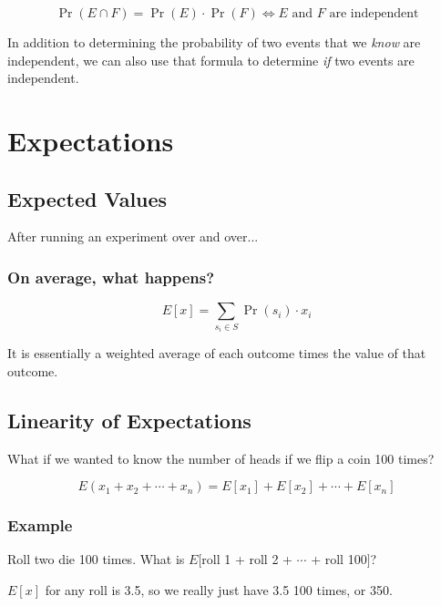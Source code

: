 \documentclass{report}
\DeclareMathOperator{\prob}{Pr}
\begin{document}
\begin{equation}
    \prob(E \cap F) = \prob(E) \cdot \prob(F) \iff \text{$E$ and $F$ are independent}
\end{equation}

In addition to determining the probability of two events that we \emph{know} are independent, we can also use that formula to determine \emph{if} two events are independent.

\section{Expectations}

\subsection{Expected Values}

After running an experiment over and over...

\subsubsection{On average, what happens?}

\begin{equation}
    E[x] = \sum_{s_i \in S}{\prob(s_i) \cdot x_i}
\end{equation}

It is essentially a weighted average of each outcome times the value of that outcome.

\subsection{Linearity of Expectations}

What if we wanted to know the number of heads if we flip a coin 100 times?

\begin{equation}
    E(x_1 + x_2 + \cdots + x_n) = E[x_1] + E[x_2] + \cdots + E[x_n]
\end{equation}

\subsubsection{Example}

Roll two die 100 times.
What is $E[$roll 1 + roll 2 + $\cdots$ + roll 100$]$?

$E[x]$ for any roll is 3.5, so we really just have 3.5 100 times, or 350.
\end{document}
